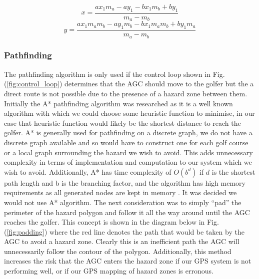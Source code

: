 \documentclass[11pt,landscape]{article}
\begin{document}
\begin{multicols}{3}
\begin{figure}[H]
\begin{mdframed}
    \begin{center}
        \begin{equation}
            x = \frac{ax_{1} m_{a} - ay_{1} - bx_{1} m_{b} + by_{1}}{m_{a} - m_{b}}
            \label{eq:x}
        \end{equation}
        \begin{equation}
            y = \frac{ax_{1} m_{a} m_{b} - ay_{1} m_{b} - bx_{1} m_{a} m_{b} + by_{1} m_{a}}{m_{a} - m_{b}}
            \label{eq:y}
        \end{equation}
    \end{center}
    \end{mdframed}
    \label{fig:segment_calculations}
\end{figure}

\subsubsection{Pathfinding}
The pathfinding algorithm is only used if the control loop shown in Fig.
(\ref{fig:control_loop}) determines that the AGC should move to the golfer but
the a direct route is not possible due to the presence of a hazard zone between
them. Initially the A* pathfinding algorithm was researched as it is a well
known algorithm with which we could choose some heuristic function to minimise,
in our case that heuristic function would likely be the shortest distance to
reach the golfer. A* is generally used for pathfinding on a discrete graph, we
do not have a discrete graph available and so would have to construct one for
each golf course or a local graph surrounding the hazard we wish to avoid. This
adds unnecessary complexity in terms of implementation and computation to our
system which we wish to avoid. Additionally, A* has time complexity of $O(b^d)$
if $d$ is the shortest path length and b is the branching factor, and the
algorithm has high memory requirements as all generated nodes are kept in memory
\cite{astar_2009}. It was decided we would not use A* algorithm. The next
consideration was to simply ``pad'' the perimeter of the hazard polygon and
follow it all the way around until the AGC reaches the golfer. This concept is
shown in the diagram below in Fig. (\ref{fig:padding}) where the red line
denotes the path that would be taken by the AGC to avoid a hazard zone. Clearly
this is an inefficient path the AGC will unnecessarily follow the contour of the
polygon. Additionally, this method increases the risk that the AGC enters the
hazard zone if our GPS system is not performing well, or if our GPS mapping of
hazard zones is erronous.  



\end{multicols}
\end{document}
